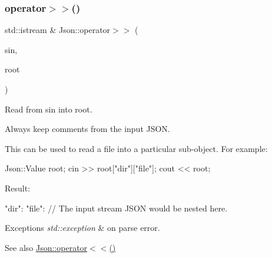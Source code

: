 \subsubsection{\texorpdfstring{operator$>$$>$()}{operator>>()}}
{\footnotesize\ttfamily std\+::istream \& Json\+::operator$>$$>$ (\begin{DoxyParamCaption}\item[{std\+::istream \&}]{sin,  }\item[{Value \&}]{root }\end{DoxyParamCaption})}



Read from \textquotesingle{}sin\textquotesingle{} into \textquotesingle{}root\textquotesingle{}. 

Always keep comments from the input J\+S\+ON.

This can be used to read a file into a particular sub-\/object. For example\+: 
\begin{DoxyCode}
Json::Value root;
cin >> root[\textcolor{stringliteral}{"dir"}][\textcolor{stringliteral}{"file"}];
cout << root;
\end{DoxyCode}
 Result\+: \begin{DoxyVerb}{
"dir": {
    "file": {
    // The input stream JSON would be nested here.
    }
}
}
\end{DoxyVerb}
 
\begin{DoxyExceptions}{Exceptions}
{\em std\+::exception} & on parse error. \\
\hline
\end{DoxyExceptions}
\begin{DoxySeeAlso}{See also}
\hyperlink{namespace_json_a87bc83d7e90fc666d28aa16727deda2f}{Json\+::operator$<$$<$()} 
\end{DoxySeeAlso}

